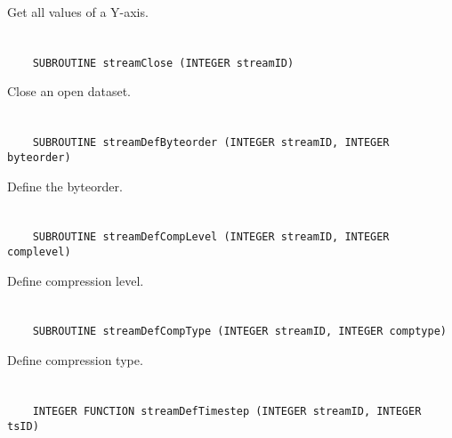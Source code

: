 Get all values of a Y-axis.


\section*{\tt {}}

\begin{verbatim}
    SUBROUTINE streamClose (INTEGER streamID)
\end{verbatim}

Close an open dataset.


\section*{\tt {}}

\begin{verbatim}
    SUBROUTINE streamDefByteorder (INTEGER streamID, INTEGER byteorder)
\end{verbatim}

Define the byteorder.


\section*{\tt {}}

\begin{verbatim}
    SUBROUTINE streamDefCompLevel (INTEGER streamID, INTEGER complevel)
\end{verbatim}

Define compression level.


\section*{\tt {}}

\begin{verbatim}
    SUBROUTINE streamDefCompType (INTEGER streamID, INTEGER comptype)
\end{verbatim}

Define compression type.


\section*{\tt {}}

\begin{verbatim}
    INTEGER FUNCTION streamDefTimestep (INTEGER streamID, INTEGER tsID)
\end{verbatim}

